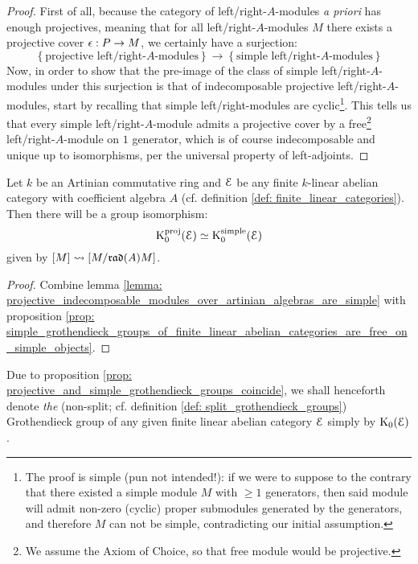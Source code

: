                 \begin{proof}
                    First of all, because the category of left/right-$A$-modules \textit{a priori} has enough projectives, meaning that for all left/right-$A$-modules $M$ there exists a projective cover $\epsilon: P \to M$, we certainly have a surjection:
                        $$
                            \left\{\text{projective left/right-$A$-modules}\right\}
                            \to
                            \left\{\text{simple left/right-$A$-modules}\right\}
                        $$
                    Now, in order to show that the pre-image of the class of simple left/right-$A$-modules under this surjection is that of indecomposable projective left/right-$A$-modules, start by recalling that simple left/right-modules are cyclic\footnote{The proof is simple (pun not intended!): if we were to suppose to the contrary that there existed a simple module $M$ with $\geq 1$ generators, then said module will admit non-zero (cyclic) proper submodules generated by the generators, and therefore $M$ can not be simple, contradicting our initial assumption.}. This tells us that every simple left/right-$A$-module admits a projective cover by a free\footnote{We assume the Axiom of Choice, so that free module would be projective.} left/right-$A$-module on $1$ generator, which is of course indecomposable and unique up to isomorphisms, per the universal property of left-adjoints.
                \end{proof}
            \begin{proposition} \label{prop: projective_and_simple_grothendieck_groups_coincide}
                Let $k$ be an Artinian commutative ring and $\mathcal{E}$ be any finite $k$-linear abelian category with coefficient algebra $A$ (cf. definition \ref{def: finite_linear_categories}). Then there will be a group isomorphism:
                    $$\mathrm{K}_0^{\mathrm{proj}}(\mathcal{E}) \simeq \mathrm{K}_0^{\mathrm{simple}}(\mathcal{E})$$
                given by $[M] \leadsto [M/\mathfrak{rad}(A) M]$.
            \end{proposition}
                \begin{proof}
                    Combine lemma \ref{lemma: projective_indecomposable_modules_over_artinian_algebras_are_simple} with proposition \ref{prop: simple_grothendieck_groups_of_finite_linear_abelian_categories_are_free_on_simple_objects}.
                \end{proof}
            \begin{convention}
                Due to proposition \ref{prop: projective_and_simple_grothendieck_groups_coincide}, we shall henceforth denote \textit{the} (non-split; cf. definition \ref{def: split_grothendieck_groups}) Grothendieck group of any given finite linear abelian category $\mathcal{E}$ simply by $\mathrm{K}_0(\mathcal{E})$.
            \end{convention}
